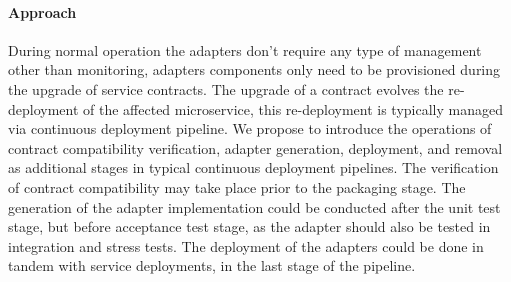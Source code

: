 \paragraph{Approach}
During normal operation the adapters don't require any type of management other than monitoring,
adapters components only need to be provisioned during the upgrade of service contracts.
The upgrade of a contract evolves the re-deployment of the affected microservice, this re-deployment is typically managed
via continuous deployment pipeline.
We propose to introduce the operations of contract compatibility verification, adapter generation, deployment,
and removal as additional stages in typical continuous deployment pipelines.
The verification of contract compatibility may take place prior to the packaging stage.
The generation of the adapter implementation could be conducted after the unit test stage, but before acceptance test stage,
as the adapter should also be tested in integration and stress tests.
The deployment of the adapters could be done in tandem with service deployments, in the last stage of the pipeline.